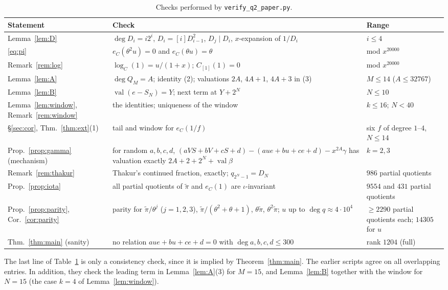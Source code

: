 \documentclass[11pt]{amsart}
\theoremstyle{remark}
\numberwithin{equation}{section}
\newcommand{\pit}{\tilde\pi}
\newcommand{\eC}{e_C}
\DeclareMathOperator{\val}{val}
\begin{document}
\begin{table}[ht]
\centering
\small
\setlength{\tabcolsep}{4pt}
\renewcommand{\arraystretch}{1.15}
\begin{tabular}{p{}p{}p{}}
\toprule
Statement & Check & Range\\
\midrule
Lemma~\ref{lem:D} & $\deg D_i=i2^i$, $D_i=[i]D_{i-1}^2$, $D_j\mid D_i$, $x$-expansion of $1/D_i$ & $i\le4$\\
\eqref{eq:pi} & $\eC(\theta^2u)=0$ and $\eC(\theta u)=\theta$ & mod $x^{20000}$\\
Remark~\ref{rem:log} & $\log_C(1)=u/(1+x)$; $C_{[1]}(1)=0$ & mod $x^{20000}$\\
Lemma~\ref{lem:A} & $\deg Q_M=A$; identity (2); valuations $2A$, $4A+1$, $4A+3$ in (3) & $M\le14$ ($A\le32767$)\\
Lemma~\ref{lem:B} & $\val(e-S_N)=Y$; next term at $Y+2^N$ & $N\le10$\\
Lemma~\ref{lem:window}, Remark~\ref{rem:window} & the identities; uniqueness of the window & $k\le16$; $N<40$\\
\S\ref{sec:cor}, Thm.~\ref{thm:ext}(1) & tail and window for $\eC(1/f)$ & six $f$ of degree $1$--$4$, $N\le14$\\
Prop.~\ref{prop:gamma} (mechanism) & for random $a,b,c,d$, $(aVS+bV+cS+d)-(aue+bu+ce+d)-x^{2A}\gamma$ has valuation exactly $2A+2+2^N+\val\beta$ & $k=2,3$\\
Remark~\ref{rem:thakur} & Thakur's continued fraction, exactly; $q_{2^N-1}=D_N$ & $986$ partial quotients\\
Prop.~\ref{prop:iota} & all partial quotients of $\pit$ and $\eC(1)$ are $\iota$-invariant & $9554$ and $431$ partial quotients\\
Prop.~\ref{prop:parity}, Cor.~\ref{cor:parity} & parity for $\pit/\theta^j$ ($j=1,2,3$), $\pit/(\theta^2+\theta+1)$, $\theta\pit$, $\theta^2\pit$; $u$ up to $\deg q\approx4\cdot10^4$ & $\ge2290$ partial quotients each; $14305$ for $u$\\
Thm.~\ref{thm:main} (sanity) & no relation $aue+bu+ce+d=0$ with $\deg a,b,c,d\le300$ & rank $1204$ (full)\\
\bottomrule
\end{tabular}
\caption{Checks performed by \texttt{verify\_q2\_paper.py}.}\label{tab:checks}
\end{table}

The last line of Table~\ref{tab:checks} is only a consistency check, since it is implied by Theorem~\ref{thm:main}. The earlier scripts agree on all overlapping entries. In addition, they check the leading term in Lemma~\ref{lem:A}(3) for $M=15$, and Lemma~\ref{lem:B} together with the window for $N=15$ (the case $k=4$ of Lemma~\ref{lem:window}).
\end{document}
